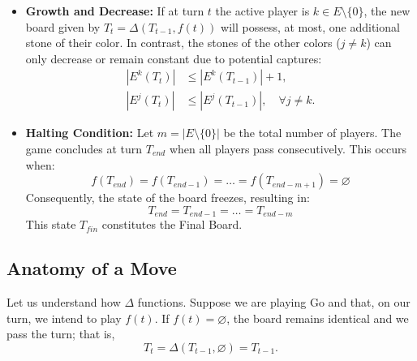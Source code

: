 \begin{itemize}
	\item \textbf{Growth and Decrease:} If at turn \(t\) the active player is \(k \in E \setminus \{0\}\), the new board given by \(T_t = \Delta(T_{t-1}, f(t))\) will possess, at most, one additional stone of their color. In contrast, the stones of the other colors (\(j \neq k\)) can only decrease or remain constant due to potential captures:
	\begin{align*}
		|E^k(T_t)| &\le |E^k(T_{t-1})| + 1,\\
		|E^j(T_t)| &\le |E^j(T_{t-1})|, \quad \forall j \neq k.
	\end{align*}
	
	\item \textbf{Halting Condition:} Let \(m = |E \setminus \{0\}|\) be the total number of players. The game concludes at turn \(T_{end}\) when all players pass consecutively. This occurs when:
	$$f(T_{end}) = f(T_{end-1}) = \dots = f(T_{end-m+1}) = \varnothing$$
	Consequently, the state of the board freezes, resulting in:
	$$T_{{end}} = T_{{end-1}} = \dots = T_{{end-m}}$$
	This state \(T_{{fin}}\) constitutes the Final Board.
\end{itemize}


\subsection{Anatomy of a Move}

Let us understand how \(\Delta\) functions. Suppose we are playing Go and that, on our turn, we intend to play \(f(t)\).
If \(f(t) = \varnothing\), the board remains identical and we pass the turn; that is,
$$T_{t} = \Delta(T_{t-1}, \varnothing) = T_{t-1}.$$

